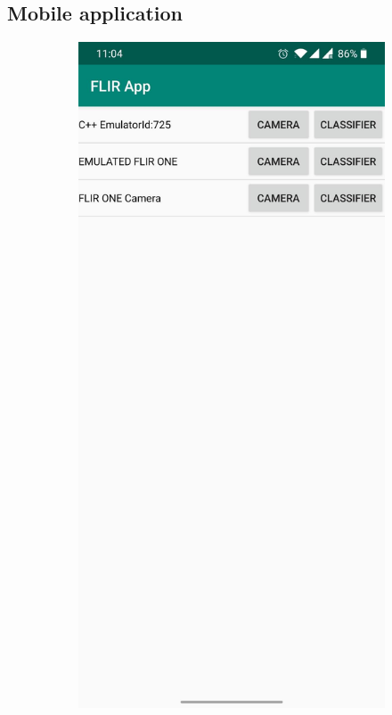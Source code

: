 \documentclass{l4proj}
\begin{document}
\begin{appendices}

\chapter{Mobile application}

\begin{figure}[ht]
  \centering
  \begin{subfigure}[h!]{0.32\textwidth}
    \includegraphics[width=\textwidth]{images/app/overview.jpg}

\end{subfigure}
\end{figure}
\end{appendices}
\end{document}
